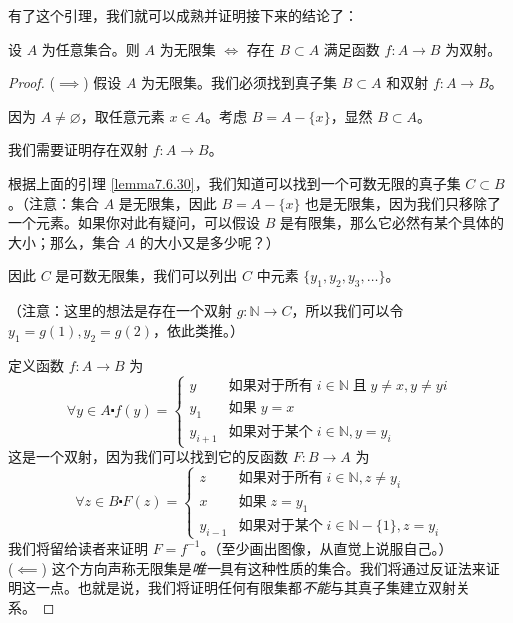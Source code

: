 有了这个引理，我们就可以成熟并证明接下来的结论了：

\begin{theorem}
    设 $A$ 为任意集合。则 $A$ 为无限集 $\iff$ 存在 $B \subset A$ 满足函数 $f : A \to B$ 为双射。
\end{theorem}

\begin{proof}
    ($\implies$) 假设 $A$ 为无限集。我们必须找到真子集 $B \subset A$ 和双射 $f : A \to B$。

    因为 $A \ne \varnothing$，取任意元素 $x \in A$。考虑 $B = A-\{x\}$，显然 $B \subset A$。

    我们需要证明存在双射 $f : A \to B$。

    根据上面的引理 \ref{lemma7.6.30}，我们知道可以找到一个可数无限的真子集 $C \subset B$。（注意：集合 $A$ 是无限集，因此 $B = A - \{x\}$ 也是无限集，因为我们只移除了一个元素。如果你对此有疑问，可以假设 $B$ 是有限集，那么它必然有某个具体的大小；那么，集合 $A$ 的大小又是多少呢？）

    因此 $C$ 是可数无限集，我们可以列出 $C$ 中元素 $\{y_1, y_2, y_3, \dots\}$。

    （注意：这里的想法是存在一个双射 $g : \mathbb{N} \to C$，所以我们可以令 $y_1 = g(1), y_2 = g(2)$，依此类推。）

    定义函数 $f : A \to B$ 为
    \[\forall y \in A \centerdot f(y) = \begin{cases}
            y       & \text{如果对于所有}\; i \in \mathbb{N} \;\text{且}\; y \ne x, y \ne yi \\
            y_1     & \text{如果}\; y = x                                               \\
            y_{i+1} & \text{如果对于某个}\; i \in \mathbb{N}, y = y_i
        \end{cases}\]
    这是一个双射，因为我们可以找到它的反函数 $F : B \to A$ 为
    \[\forall z \in B \centerdot F(z) = \begin{cases}
            z & \text{如果对于所有}\; i \in \mathbb{N}, z \ne y_i \\
            x & \text{如果}\; z = y_1                \\
            y_{i-1} &\text{如果对于某个}\; i \in \mathbb{N}-\{1\}, z = y_i
        \end{cases}\]
    我们将留给读者来证明 $F = f^{-1}$。（至少画出图像，从直觉上说服自己。）\\

    ($\impliedby$) 这个方向声称无限集是\emph{唯一}具有这种性质的集合。我们将通过反证法来证明这一点。也就是说，我们将证明任何有限集都\emph{不能}与其真子集建立双射关系。


\end{proof}
